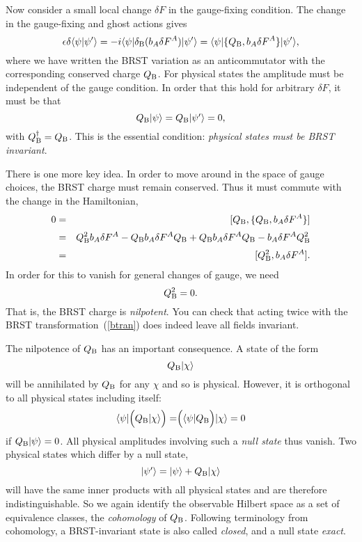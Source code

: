 Now consider a small local change $\delta F$ in the gauge-fixing condition.
The change in the gauge-fixing and ghost actions gives
\begin{equation}
\epsilon \delta \langle \psi |\psi' \rangle =
-i \langle \psi | \delta_{\rm B} (b_A \delta F^A) |\psi' \rangle
= \langle \psi | \{ Q_{\rm B}, b_A \delta F^A \}|\psi' \rangle, \label{fqbi}
\end{equation}
where we have written the BRST variation as an anticommutator with the
corresponding conserved charge $Q_{\rm B}$.  For physical states the
amplitude must be independent of the gauge condition.
In order that this hold for arbitrary $\delta F$, it must be that
\begin{equation}
Q_{\rm B} \mbox{$| \psi \rangle$} = Q_{\rm B} \mbox{$| \psi' \rangle$} = 0,
\end{equation}
with $Q_{\rm B}^\dagger = Q_{\rm B}$.
This is the essential condition:
{\it physical states must be BRST invariant}.

There is one more key idea.  In order to move around in the space of gauge
choices, the BRST charge must remain conserved.  Thus it must commute with
the change in the Hamiltonian,
\begin{eqnarray}
0 &=& [Q_{\rm B}, \{ Q_{\rm B}, b_A \delta F^A \} ]   \nonumber\\[2pt]
&=& Q_{\rm B}^2 b_A \delta F^A - Q_{\rm B} b_A \delta F^A Q_{\rm B} 
+ Q_{\rm B} b_A \delta F^A Q_{\rm B}
- b_A \delta F^A Q_{\rm B}^2\nonumber\\[2pt]
&=& [Q_{\rm B}^2,  b_A \delta F^A ].
\end{eqnarray}
In order for this to vanish for general changes of gauge, we need
\begin{equation}
Q_{\rm B}^2 = 0.
\end{equation}
That is, the BRST charge is {\it nilpotent}.
You can check that acting twice with the BRST
transformation~(\ref{btran}) does indeed leave all fields invariant.

The nilpotence of $Q_{\rm B}$ has an important consequence.  A state of the form
\begin{equation}
Q_{\rm B} \mbox{$| \chi \rangle$} \label{nulst}
\end{equation}
will be annihilated by $Q_{\rm B}$ for any $\chi$ and so is physical.  However,
it is orthogonal to all physical states including itself:
\begin{equation}
\mbox{$\langle \psi $}| \Bigl( Q_{\rm B} \mbox{$| \chi \rangle$} \Bigr) =
\Bigr( \mbox{$\langle \psi $}| Q_{\rm B} \Bigr) \mbox{$| \chi \rangle$} = 0
\end{equation}
if $Q_{\rm B} \mbox{$| \psi \rangle$} = 0$.  All physical amplitudes involving such a {\it null
state} thus vanish.  Two physical states which differ by a null state,
\begin{equation}
\mbox{$| \psi' \rangle$} = \mbox{$| \psi \rangle$} + Q_{\rm B} \mbox{$| \chi \rangle$}
\end{equation}
will have the same inner products with all physical states and are therefore
indistinguishable.  So we again identify the observable Hilbert space as a
set of equivalence classes, the {\it cohomology} of $Q_{\rm B}$. 
Following terminology from cohomology, a BRST-invariant state is also
called {\it closed}, and a null state {\it exact}.

